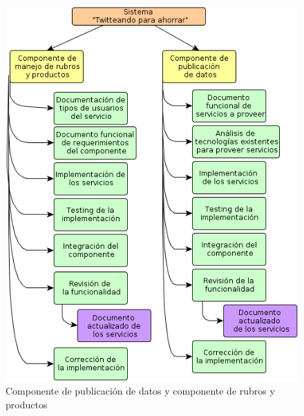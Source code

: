 \begin{figure}[H]
\centering
\includegraphics[scale=\escaladefault]{graficos/wbs/comp_rubros_y_api.png}
\caption{Componente de publicación de datos y componente de rubros y productos}
\end{figure}


